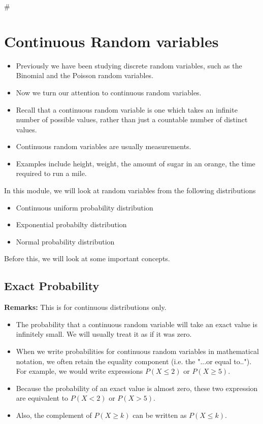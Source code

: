 #
	
\section*{Continuous Random variables}
\begin{itemize}
\item Previously we have been studying discrete random variables, such as the Binomial and the Poisson random variables.
\item Now we turn our attention to continuous random variables.
\item Recall that a continuous random variable is one which takes an infinite number of possible values, rather than just a countable number of distinct values.
\item Continuous random variables are usually measurements.
\item Examples include height, weight, the amount of sugar in an orange, the time required to run a mile.
\end{itemize}


	In this module, we will look at random variables from the following distributions
	\begin{itemize}
		\item  Continuous uniform probability distribution
		\item  Exponential probabilty distribution
		\item  Normal probability distribution
	\end{itemize}
	
	Before this, we will look at some important concepts.


\subsection{Exact Probability}

\begin{framed}
\noindent \textbf{Remarks:} This is for continuous distributions only.
\begin{itemize}
\item The probability that a continuous random variable will take an exact value is infinitely small.
We will usually treat it as if it was zero.
\item
When we write probabilities for continuous random variables in mathematical notation, we often retain the equality component (i.e. the "...or equal to..").\\
For example, we would write expressions $P(X \leq 2)$ or $P(X \geq 5)$.
\item
Because the probability of an exact value is almost zero, these two expression are equivalent to $P(X < 2)$
or $P(X > 5)$. \item Also, the complement of $P(X \geq k)$ can be written as $P(X \leq k)$.
\end{itemize}
\end{framed}






